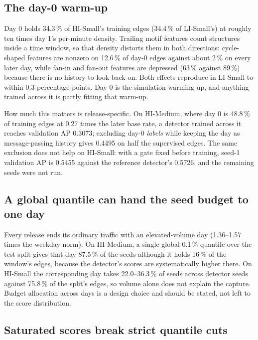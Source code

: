 \subsection{The day-0 warm-up}

Day 0 holds 34.3\,\% of HI-Small's training edges (34.4\,\% of LI-Small's) at roughly ten
times day 1's per-minute density. Trailing motif features count structures inside a time
window, so that density distorts them in both directions: cycle-shaped features are nonzero on
12.6\,\% of day-0 edges against about 2\,\% on every later day, while fan-in and fan-out
features are depressed (63\,\% against 89\,\%) because there is no history to look back on.
Both effects reproduce in LI-Small to within 0.3 percentage points.
Day 0 is the simulation warming up, and anything trained across it is partly fitting that
warm-up.

How much this matters is release-specific. On HI-Medium, where day 0 is 48.8\,\% of training
edges at 0.27 times the later base rate, a detector trained across it reaches validation AP
0.3073; excluding day-0 \emph{labels} while keeping the day as message-passing history gives
0.4495 on half the supervised edges.
The same exclusion does not help on HI-Small: with a gate fixed before training, seed-1
validation AP is 0.5455 against the reference detector's 0.5726, and the remaining seeds were
not run.

\subsection{A global quantile can hand the seed budget to one day}

Every release ends its ordinary traffic with an elevated-volume day (1.36--1.57 times the
weekday norm). On HI-Medium, a single global 0.1\,\% quantile over the test split gives that
day 87.5\,\% of the seeds although it holds 16\,\% of the window's edges, because the
detector's scores are systematically higher there. On HI-Small the corresponding day takes
22.0--36.3\,\% of seeds across detector seeds against 75.8\,\% of the split's edges, so volume
alone does not explain the capture.
Budget allocation across days is a design choice and should be stated, not left to the score
distribution.

\subsection{Saturated scores break strict quantile cuts}
\label{sec:findings-saturation}

